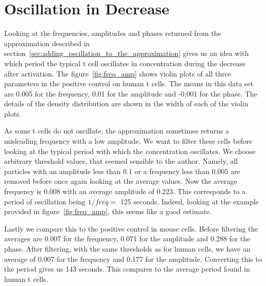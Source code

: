 \newpage
\section{Oscillation in Decrease}
\label{sec:oscillation_in_decrease}

Looking at the frequencies, amplitudes and phases returned from the approximation described in section~\ref{sec:adding_oscillation_to_the_approximation} gives us an idea with which period the typical t cell oscillates in \Calcium concentration during the decrease after activation. The figure~\ref{fig:freq_amp} shows violin plots of all three parameters in the positive control on human t cells. The means in this data set are 0.005 for the frequency, 0.01 for the amplitude and -0.001 for the phase. The details of the density distribution are shown in the width of each of the violin plots.

As some t cells do not oscillate, the approximation sometimes returns a misleading frequency with a low amplitude. We want to filter these cells before looking at the typical period with which the \Calcium concentration oscillates. We choose arbitrary threshold values, that seemed sensible to the author. Namely, all particles with an amplitude less than 0.1 or a frequency less than 0.005 are removed before once again looking at the average values. Now the average frequency is 0.008 with an average amplitude of 0.223. This corresponds to a period of oscillation being $1/freq = $ 125 seconds. Indeed, looking at the example provided in figure~\ref{fig:freq_amp}, this seems like a good estimate.

Lastly we compare this to the positive control in mouse cells. Before filtering the averages are 0.007 for the frequency, 0.071 for the amplitude and 0.288 for the phase. After filtering, with the same thresholds as for human cells, we have an average of 0.007 for the frequency and 0.177 for the amplitude. Converting this to the period gives us 143 seconds. This compares to the average period found in human t cells.

